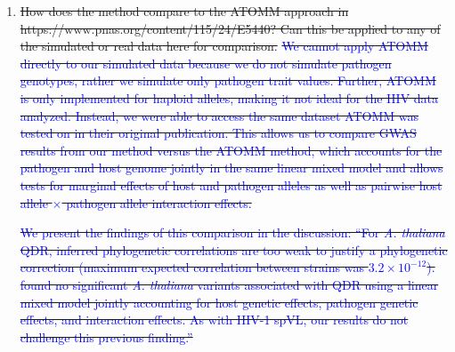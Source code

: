 \documentclass[12pt]{article} %
\providecommand{\DIFdel}[1]{{\protect\color{red}\sout{#1}}}                      %
\begin{document}
\begin{enumerate}%
\item%
\DIFdel{How does the method compare to the ATOMM approach in https://www.pnas.org/content/115/24/E5440? Can this be applied to any of the simulated or real data here for comparison. }%
\DIFdel{\textcolor{blue}{We cannot apply ATOMM directly to our simulated data because we do not simulate pathogen genotypes, rather we simulate only pathogen trait values. Further, ATOMM is only implemented for haploid alleles, making it not ideal for the HIV data analyzed. Instead, we were able to access the same dataset ATOMM was tested on in their original publication. This allows us to compare GWAS results from our method versus the ATOMM method, which accounts for the pathogen and host genome jointly in the same linear mixed model and allows tests for marginal effects of host and pathogen alleles as well as pairwise host allele $\times$ pathogen allele interaction effects.}
    }%

\DIFdel{\textcolor{blue}{We present the findings of this comparison in the discussion: ``For \emph{A. thaliana} QDR, inferred phylogenetic correlations are too weak to justify a phylogenetic correction (maximum expected correlation between strains was $3.2 \times 10^{-12}$). \cite{Wang2018Two-wayGenomes} found no significant \emph{A. thaliana} variants associated with QDR using a linear mixed model jointly accounting for host genetic effects, pathogen genetic effects, and interaction effects. As with HIV-1 spVL, our results do not challenge this previous finding.''}
    }%


\end{enumerate}
\end{document}
